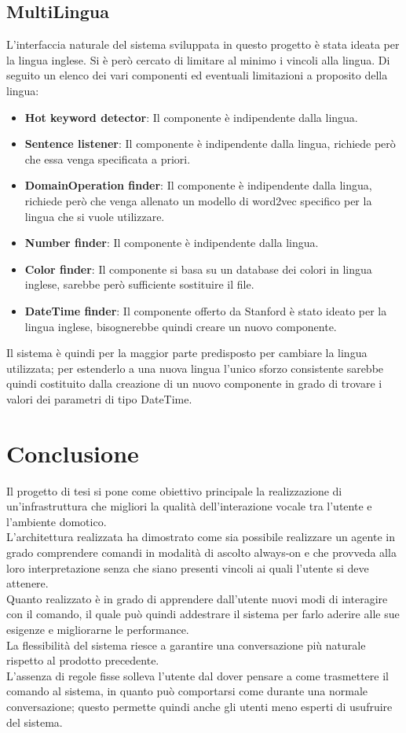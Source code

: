 \documentclass[twoside]{supsistudent}
\begin{document}
\section{MultiLingua}
L'interfaccia naturale del sistema sviluppata in questo progetto è stata ideata per la lingua inglese. Si è però cercato di limitare al minimo i vincoli alla lingua. Di seguito un elenco dei vari componenti ed eventuali limitazioni a proposito della lingua:
\begin{itemize}
      \item \textbf{Hot keyword detector}: Il componente è indipendente dalla lingua.
      \item \textbf{Sentence listener}: Il componente è indipendente dalla lingua, richiede però che essa venga specificata a priori.
      \item \textbf{DomainOperation finder}: Il componente è indipendente dalla lingua, richiede però che venga allenato un modello di word2vec specifico per la lingua che si vuole utilizzare.
      \item \textbf{Number finder}: Il componente è indipendente dalla lingua.
      \item \textbf{Color finder}: Il componente si basa su un database dei colori in lingua inglese, sarebbe però sufficiente sostituire il file.
      \item \textbf{DateTime finder}: Il componente offerto da Stanford è stato ideato per la lingua inglese, bisognerebbe quindi creare un nuovo componente.
\end{itemize}
Il sistema è quindi per la maggior parte predisposto per cambiare la lingua utilizzata; per estenderlo a una nuova lingua l'unico sforzo consistente sarebbe quindi costituito dalla creazione di un nuovo componente in grado di trovare i valori dei parametri di tipo DateTime.
\chapter{Conclusione}
Il progetto di tesi si pone come obiettivo principale la realizzazione di un'infrastruttura che migliori la qualità dell'interazione vocale tra l'utente e l'ambiente domotico.\\
L'architettura realizzata ha dimostrato come sia possibile realizzare un agente in grado comprendere comandi in modalità di ascolto always-on e che provveda alla loro interpretazione senza che siano presenti vincoli ai quali l'utente si deve attenere.\\
Quanto realizzato è in grado di apprendere dall'utente nuovi modi di interagire con il comando, il quale può quindi addestrare il sistema per farlo aderire alle sue esigenze e migliorarne le performance.\\
La flessibilità del sistema riesce a garantire una conversazione più naturale rispetto al prodotto precedente.\\
L’assenza di regole fisse solleva l’utente dal dover pensare a come trasmettere il comando al sistema, in quanto può comportarsi come durante una normale conversazione; questo permette quindi anche gli utenti meno esperti di usufruire del sistema.\\
\end{document}
